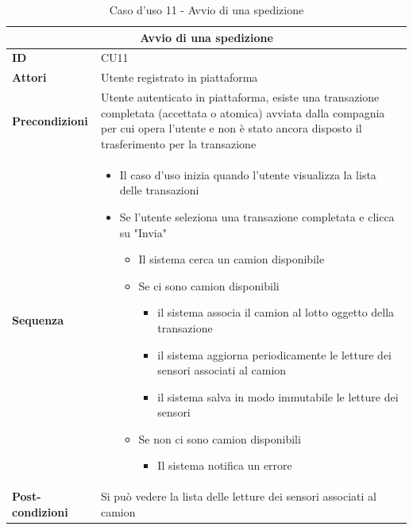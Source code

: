 \documentclass[a4paper,11pt]{article}
\begin{document}
\begin{table}[H]
  \centering
  \begin{tabular}{|m{2cm}|m{10.5cm}|}
    \hline
    \multicolumn{2}{|c|}{\textbf{Avvio di una spedizione}} \\ \hline
    \multicolumn{1}{|l|}{\textbf{ID}}              & CU11  \\ \hline
    \multicolumn{1}{|l|}{\textbf{Attori}}          &

    Utente registrato in piattaforma

    \\ \hline
    \multicolumn{1}{|l|}{\textbf{Precondizioni}}   &
    Utente autenticato in piattaforma, esiste una transazione completata (accettata o atomica) avviata dalla compagnia per cui opera l'utente e non è stato ancora disposto il trasferimento per la transazione
    \\ \hline
    \multicolumn{1}{|l|}{\textbf{Sequenza}}        &

    \begin{itemize}
      \item Il caso d'uso inizia quando l'utente visualizza la lista delle transazioni
      \item Se l'utente seleziona una transazione completata e clicca su "Invia"
            \begin{itemize}
              \item Il sistema cerca un camion disponibile
              \item Se ci sono camion disponibili
                    \begin{itemize}
                      \item il sistema associa il camion al lotto oggetto della transazione
                      \item il sistema aggiorna periodicamente le letture dei sensori associati al camion
                      \item il sistema salva in modo immutabile le letture dei sensori
                    \end{itemize}
              \item Se non ci sono camion disponibili
                    \begin{itemize}
                      \item Il sistema notifica un errore
                    \end{itemize}
            \end{itemize}
    \end{itemize}

    \\ \hline
    \multicolumn{1}{|l|}{\textbf{Post-condizioni}} &

    Si può vedere la lista delle letture dei sensori associati al camion

    \\ \hline
  \end{tabular}
  \caption{Caso d'uso 11 - Avvio di una spedizione }
  \label{cu:CU11}
\end{table}
\end{document}
